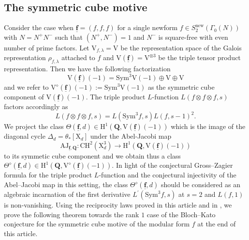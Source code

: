 \documentclass[10pt]{amsart}
\numberwithin{equation}{section}
\theoremstyle{plain}
\numberwithin{equation}{section}
\theoremstyle{definition}
\theoremstyle{remark}
\def\triplef{\underline{\mathbf{f}}}
\def\QQ{\mathbf{Q}}
\def\rmH{\mathrm{H}}
\def\rmX{\mathrm{X}}
\def\rmV{\mathrm{V}}
\begin{document}
\subsection{The symmetric cube motive}  Consider the case when $\triplef=(f, f, f)$ for a single newform $f\in S^{\mathrm{new}}_{2}(\Gamma_{0}(N))$ with $N=N^{+}N^{-}$ such that $(N^{+}, N^{-})=1$ and $N^{-}$ is square-free with {even} number of prime factors. Let $\rmV_{f, \lambda}=\rmV$ be the representation space of  the Galois representation $\rho_{f, \lambda}$ attached to $f$ and $\rmV({\triplef})=\rmV^{\otimes 3}$ be the triple tensor product representation. Then we have the following factorization
\begin{equation*}
\rmV({\triplef})(-1)=\mathrm{Sym}^{3}\rmV(-1)\oplus \rmV\oplus \rmV
\end{equation*}
and we refer to $\rmV^{\diamond}(\triplef)(-1):=\mathrm{Sym}^{3}\rmV(-1)$ as the symmetric cube component of $\rmV({\triplef})(-1)$.  The triple product $L$-function $L(f\otimes f\otimes f, s)$ factors accordingly as 
\begin{equation*}
L(f\otimes f\otimes f, s)=L(\mathrm{Sym}^{3}f, s)L(f, s-1)^{2}.
\end{equation*}
 We project the class  $\Theta(\triplef, d)\in \rmH^{1}(\QQ,  \rmV(\triplef)(-1))$ which is the image of the diagonal cycle $\Delta_{d}=\theta_{*}[\rmX_{d}]$ under the Abel-Jacobi map
\begin{equation*}
 \mathrm{AJ}_{\triplef, \QQ}: \mathrm{CH}^{2}(\rmX^{3}_{d})\rightarrow \rmH^{1}(\QQ,  \rmV(\triplef)(-1))
\end{equation*}
to its symmetic cube component and we obtain thus a class $\Theta^{\diamond}(\triplef, d)\in \rmH^{1}(\QQ, \rmV^{\diamond}({\triplef})(-1))$. In light of the conjectural Gross--Zagier formula for the triple product $L$-function and the conjectural injectivity of the Abel--Jacobi map in this setting, the class  $\Theta^{\diamond}(\triplef, d)$ should be considered as an algebraic incarnation of the first derivative $L^{\prime}(\mathrm{Sym}^{3}f, s)$ at $s=2$ and $L(f, 1)$ is non-vanishing.  Using the reciprocity laws proved in this article and in \cite{Wang}, we prove the following theorem towards the rank $1$ case of the Bloch--Kato conjecture for the symmetric cube motive of the modular form $f$ at the end of this article. 
\end{document}
